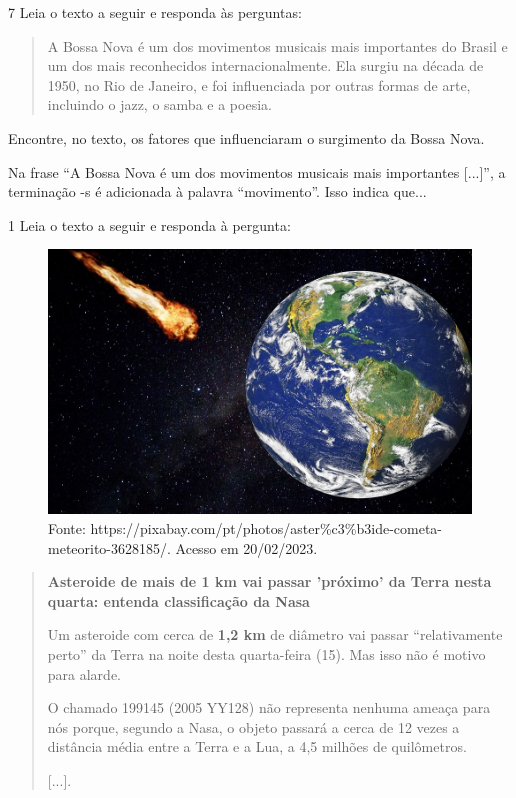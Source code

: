 
\num{7} Leia o texto a seguir e responda às perguntas:

\begin{quote}
A Bossa Nova é um dos movimentos musicais mais importantes do Brasil e
um dos mais reconhecidos internacionalmente. Ela surgiu na década de
1950, no Rio de Janeiro, e foi influenciada por outras formas de arte,
incluindo o jazz, o samba e a poesia.
\end{quote}

\begin{escolha}
\item Encontre, no texto, os fatores que influenciaram o surgimento da Bossa Nova.



\item Na frase ``A Bossa Nova é um dos movimentos musicais mais importantes {[}...{]}'', a terminação -s é adicionada à palavra ``movimento''. Isso indica que...

\end{escolha}



\num{1} Leia o texto a seguir e responda à pergunta:

\begin{figure}[htpb!]
\includegraphics[width=.5\textwidth]{./imgs/img3.jpg}
\caption{Fonte: https://pixabay.com/pt/photos/aster\%c3\%b3ide-cometa-meteorito-3628185/. Acesso em 20/02/2023.}
\end{figure}

\begin{quote}
\textbf{Asteroide de mais de 1 km vai passar 'próximo' da Terra nesta
quarta: entenda classificação da Nasa}

Um asteroide com cerca de \textbf{1,2 km} de diâmetro vai passar
``relativamente perto'' da Terra na noite desta quarta-feira (15). Mas
isso não é motivo para alarde.

O chamado 199145 (2005 YY128) não representa nenhuma ameaça para nós
porque, segundo a Nasa, o
objeto passará a cerca de 12 vezes a distância média entre a Terra e a
Lua, a 4,5 milhões de quilômetros.

{[}...{]}.

\end{quote}

